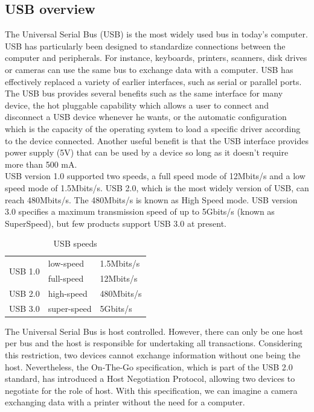 \documentclass[pdftex,10pt,a4paper]{report}
\begin{document}
\subsection{USB overview}
The Universal Serial Bus (USB) is the most widely used bus in today's computer. USB has particularly been designed to standardize connections between the computer and peripherals. For instance, keyboards, printers, scanners, disk drives or cameras can use the same bus to exchange data with a computer. USB has effectively replaced a variety of earlier interfaces, such as serial or parallel ports. The USB bus provides several benefits such as the same interface for many device, the hot pluggable capability which allows a user to connect and disconnect a USB device whenever he wants, or the automatic configuration which is the capacity of the operating system to load a specific driver according to the device connected. Another useful benefit is that the USB interface provides power supply (5V) that can be used by a device so long as it doesn't require more than 500 mA.\\

USB version 1.0 supported two speeds, a full speed mode of 12Mbits/s and a low speed mode of 1.5Mbits/s. USB 2.0, which is the most widely version of USB, can reach 480Mbits/s. The 480Mbits/s is known as High Speed mode. USB version 3.0 specifies a maximum transmission speed of up to 5Gbits/s (known as SuperSpeed), but few products support USB 3.0 at present.
\\
\begin{table}[h!]
\begin{center}
\begin{tabular}{|l|l|l|}
\hline
\multirow{2}{*}{USB 1.0} & low-speed & 1.5Mbits/s \\
 & full-speed & 12Mbits/s \\ \hline
USB 2.0 & high-speed & 480Mbits/s \\ \hline
USB 3.0 & super-speed & 5Gbits/s \\ \hline
\end{tabular}
\end{center}
\caption{USB speeds}
\label{USB speeds}
\end{table}

The Universal Serial Bus is host controlled. However, there can only be one host per bus and the host is responsible for undertaking all transactions. Considering this restriction, two devices cannot exchange information without one being the host. Nevertheless, the On-The-Go specification, which is part of the USB 2.0 standard, has introduced a Host Negotiation Protocol, allowing two devices to negotiate for the role of host. With this specification, we can imagine a camera exchanging data with a printer without the need for a computer. 
\end{document}
